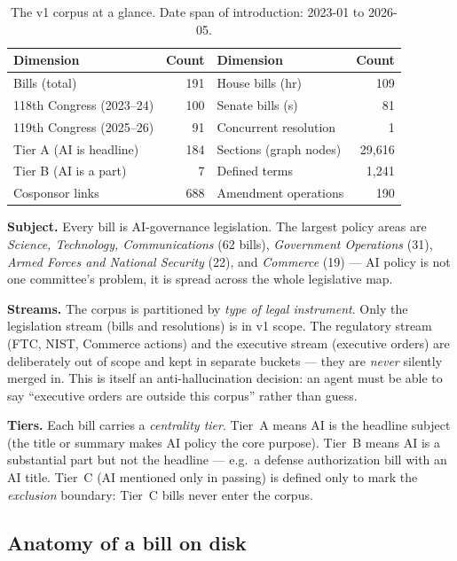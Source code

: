 \documentclass[11pt]{article}
\newcommand{\code}[1]{{\ttfamily\small #1}}
\begin{document}
\begin{table}[ht]
\centering\small
\begin{tabular}{@{}lr@{\hskip 2.2em}lr@{}}
\toprule
\textbf{Dimension} & \textbf{Count} & \textbf{Dimension} & \textbf{Count}\\
\midrule
Bills (total)            & 191  & House bills (\code{hr})        & 109\\
118th Congress (2023--24)& 100  & Senate bills (\code{s})        & 81\\
119th Congress (2025--26)& 91   & Concurrent resolution         & 1\\
Tier A (AI is headline)  & 184  & Sections (graph nodes)        & 29{,}616\\
Tier B (AI is a part)    & 7    & Defined terms                 & 1{,}241\\
Cosponsor links          & 688  & Amendment operations          & 190\\
\bottomrule
\end{tabular}
\caption{The v1 corpus at a glance. Date span of introduction: 2023-01 to
2026-05.}
\end{table}

\textbf{Subject.} Every bill is AI-governance legislation. The largest policy
areas are \emph{Science, Technology, Communications} (62 bills), \emph{Government
Operations} (31), \emph{Armed Forces and National Security} (22), and
\emph{Commerce} (19) --- AI policy is not one committee's problem, it is spread
across the whole legislative map.

\textbf{Streams.} The corpus is partitioned by \emph{type of legal instrument}.
Only the \code{legislation} stream (bills and resolutions) is in v1 scope.
The \code{regulatory} stream (FTC, NIST, Commerce actions) and the
\code{executive} stream (executive orders) are deliberately out of scope and
kept in separate buckets --- they are \emph{never} silently merged in. This is
itself an anti-hallucination decision: an agent must be able to say ``executive
orders are outside this corpus'' rather than guess.

\textbf{Tiers.} Each bill carries a \emph{centrality tier}. Tier~A means AI is
the headline subject (the title or summary makes AI policy the core purpose).
Tier~B means AI is a substantial part but not the headline --- e.g.\ a defense
authorization bill with an AI title. Tier~C (AI mentioned only in passing)
is defined only to mark the \emph{exclusion} boundary: Tier~C bills never enter
the corpus.

\subsection{Anatomy of a bill on disk}
\end{document}

